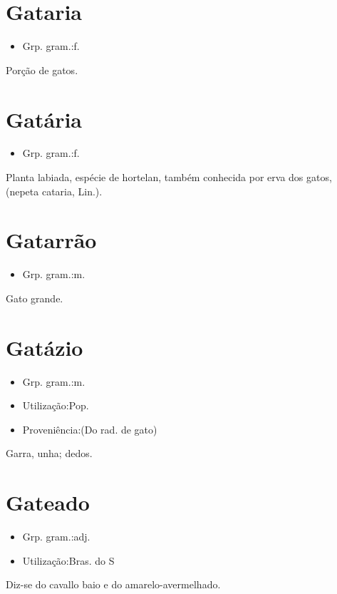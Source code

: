 \section{Gataria}
\begin{itemize}
\item {Grp. gram.:f.}
\end{itemize}
Porção de gatos.
\section{Gatária}
\begin{itemize}
\item {Grp. gram.:f.}
\end{itemize}
Planta labiada, espécie de hortelan, também conhecida por \textunderscore erva dos gatos\textunderscore , (\textunderscore nepeta cataria\textunderscore , Lin.).
\section{Gatarrão}
\begin{itemize}
\item {Grp. gram.:m.}
\end{itemize}
Gato grande.
\section{Gatázio}
\begin{itemize}
\item {Grp. gram.:m.}
\end{itemize}
\begin{itemize}
\item {Utilização:Pop.}
\end{itemize}
\begin{itemize}
\item {Proveniência:(Do rad. de \textunderscore gato\textunderscore )}
\end{itemize}
Garra, unha; dedos.
\section{Gateado}
\begin{itemize}
\item {Grp. gram.:adj.}
\end{itemize}
\begin{itemize}
\item {Utilização:Bras. do S}
\end{itemize}
Diz-se do cavallo baio e do amarelo-avermelhado.

